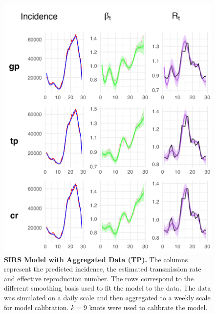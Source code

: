 \documentclass[
11pt, %
oneside, %
english, %
singlespacing, %
]{macthesis} %
\begin{document}
\begin{figure}[H]
\centering
\includegraphics[width=\textwidth]{figure/Simulated/aggregated/sim_agg_combined_tp_k10.png}
\caption[SIRS model with aggregated data (TP).]{\textbf{SIRS Model with Aggregated Data (TP).} The columns represent the predicted incidence, the estimated transmission rate and effective reproduction number. The rows correspond to the different smoothing basis used to fit the model to the data. The data was simulated on a daily scale and then aggregated to a weekly scale for model calibration. \(k=9\) knots were used to calibrate the model.}
\label{fig:sim_agg_tp}
\end{figure}
\end{document}
